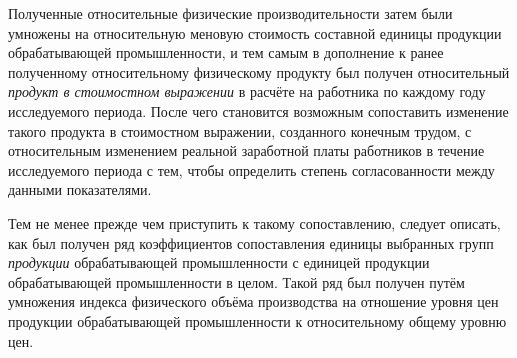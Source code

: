 \documentclass[leqno]{article}  %
\begin{document}
\par
Полученные относительные физические производительности затем были умножены на относительную меновую стоимость составной единицы продукции обрабатывающей промышленности, и тем самым в дополнение к ранее полученному относительному физическому продукту был получен относительный \emph{продукт в стоимостном выражении} в расчёте на работника по каждому году исследуемого периода. После чего становится возможным сопоставить изменение такого продукта в стоимостном выражении, созданного конечным трудом, с относительным изменением реальной заработной платы работников в течение исследуемого периода с тем, чтобы определить степень согласованности между данными показателями.
\par
Тем не менее прежде чем приступить к такому сопоставлению, следует описать, как был получен ряд коэффициентов сопоставления единицы выбранных групп \emph{продукции} обрабатывающей промышленности с единицей продукции обрабатывающей промышленности в целом. Такой ряд был получен путём умножения индекса физического объёма производства на отношение уровня цен продукции обрабатывающей промышленности к относительному общему уровню цен.
\end{document}
